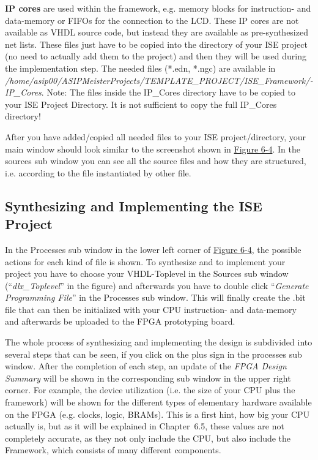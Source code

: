 \documentclass[
]{article}
\begin{document}
\textbf{IP cores} are used within the framework, e.g. memory blocks for
instruction- and data-memory or FIFOs for the connection to the LCD.
These IP cores are not available as VHDL source code, but instead they
are available as pre-synthesized net lists. These files just have to be
copied into the directory of your ISE project (no need to actually add
them to the project) and then they will be used during the
implementation step. The needed files (*.edn, *.ngc) are available in
\emph{/home/asip00/­ASIPMeisterProjects/­TEMPLATE\_PROJECT/­ISE\_Framework/­IP\_­Cores}.
Note: The files {inside} the IP\_Cores directory have to be copied to
your ISE Project Directory. It is not sufficient to copy the full
IP\_Cores directory!

After you have added/copied all needed files to your ISE
project/directory, your main window should look similar to the
screenshot shown in \protect\hyperlink{Fig64}{Figure 6-4}. In the
sources sub window you can see all the source files and how they are
structured, i.e. according to the file instantiated by other file.

\hypertarget{synthesizing-and-implementing-the-ise-project}{%
\subsection{Synthesizing and Implementing the ISE
Project}\label{synthesizing-and-implementing-the-ise-project}}

In the Processes sub window in the lower left corner of
\protect\hyperlink{Fig64}{Figure 6-4}, the possible actions for each
kind of file is shown. To synthesize and to implement your project you
have to choose your VHDL-Toplevel in the Sources sub window
(``\emph{dlx\_Toplevel}'' in the figure) and afterwards you have to
double click ``\emph{Generate Programming File}'' in the Processes sub
window. This will finally create the .bit file that can then be
initialized with your CPU instruction- and data-memory and afterwards be
uploaded to the FPGA prototyping board.

The whole process of synthesizing and implementing the design is
subdivided into several steps that can be seen, if you click on the plus
sign in the processes sub window. After the completion of each step, an
update of the \emph{FPGA Design Summary} will be shown in the
corresponding sub window in the upper right corner. For example, the
device utilization (i.e. the size of your CPU plus the framework) will
be shown for the different types of elementary hardware available on the
FPGA (e.g. clocks, logic, BRAMs). This is a first hint, how big your CPU
actually is, but as it will be explained in Chapter~6.5, these values
are not completely accurate, as they not only include the CPU, but also
include the Framework, which consists of many different components.
\end{document}

